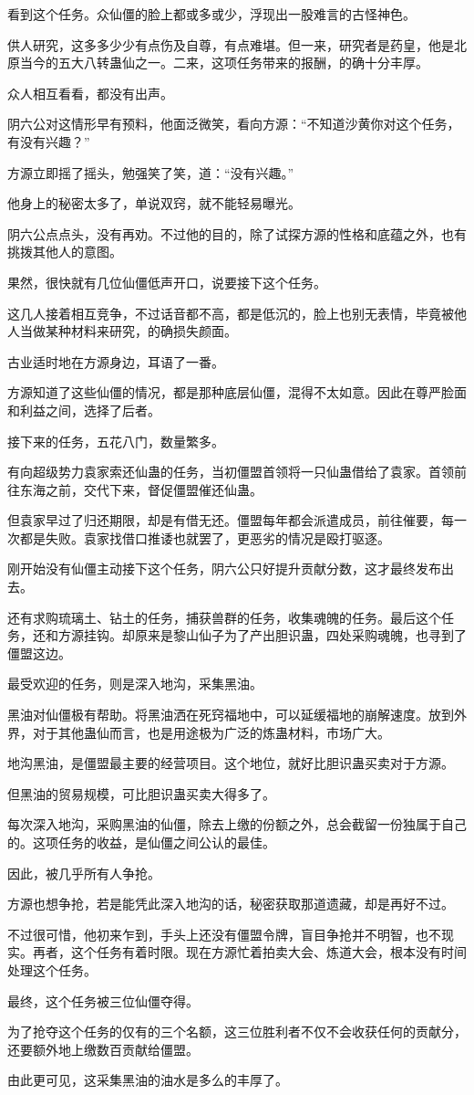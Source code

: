 \begin{this_body}
看到这个任务。众仙僵的脸上都或多或少，浮现出一股难言的古怪神色。

供人研究，这多多少少有点伤及自尊，有点难堪。但一来，研究者是药皇，他是北原当今的五大八转蛊仙之一。二来，这项任务带来的报酬，的确十分丰厚。

众人相互看看，都没有出声。

阴六公对这情形早有预料，他面泛微笑，看向方源：“不知道沙黄你对这个任务，有没有兴趣？”

方源立即摇了摇头，勉强笑了笑，道：“没有兴趣。”

他身上的秘密太多了，单说双窍，就不能轻易曝光。

阴六公点点头，没有再劝。不过他的目的，除了试探方源的性格和底蕴之外，也有挑拨其他人的意图。

果然，很快就有几位仙僵低声开口，说要接下这个任务。

这几人接着相互竞争，不过话音都不高，都是低沉的，脸上也别无表情，毕竟被他人当做某种材料来研究，的确损失颜面。

古业适时地在方源身边，耳语了一番。

方源知道了这些仙僵的情况，都是那种底层仙僵，混得不太如意。因此在尊严脸面和利益之间，选择了后者。

接下来的任务，五花八门，数量繁多。

有向超级势力袁家索还仙蛊的任务，当初僵盟首领将一只仙蛊借给了袁家。首领前往东海之前，交代下来，督促僵盟催还仙蛊。

但袁家早过了归还期限，却是有借无还。僵盟每年都会派遣成员，前往催要，每一次都是失败。袁家找借口推诿也就罢了，更恶劣的情况是殴打驱逐。

刚开始没有仙僵主动接下这个任务，阴六公只好提升贡献分数，这才最终发布出去。

还有求购琉璃土、钻土的任务，捕获兽群的任务，收集魂魄的任务。最后这个任务，还和方源挂钩。却原来是黎山仙子为了产出胆识蛊，四处采购魂魄，也寻到了僵盟这边。

最受欢迎的任务，则是深入地沟，采集黑油。

黑油对仙僵极有帮助。将黑油洒在死窍福地中，可以延缓福地的崩解速度。放到外界，对于其他蛊仙而言，也是用途极为广泛的炼蛊材料，市场广大。

地沟黑油，是僵盟最主要的经营项目。这个地位，就好比胆识蛊买卖对于方源。

但黑油的贸易规模，可比胆识蛊买卖大得多了。

每次深入地沟，采购黑油的仙僵，除去上缴的份额之外，总会截留一份独属于自己的。这项任务的收益，是仙僵之间公认的最佳。

因此，被几乎所有人争抢。

方源也想争抢，若是能凭此深入地沟的话，秘密获取那道遗藏，却是再好不过。

不过很可惜，他初来乍到，手头上还没有僵盟令牌，盲目争抢并不明智，也不现实。再者，这个任务有着时限。现在方源忙着拍卖大会、炼道大会，根本没有时间处理这个任务。

最终，这个任务被三位仙僵夺得。

为了抢夺这个任务的仅有的三个名额，这三位胜利者不仅不会收获任何的贡献分，还要额外地上缴数百贡献给僵盟。

由此更可见，这采集黑油的油水是多么的丰厚了。

\end{this_body}

